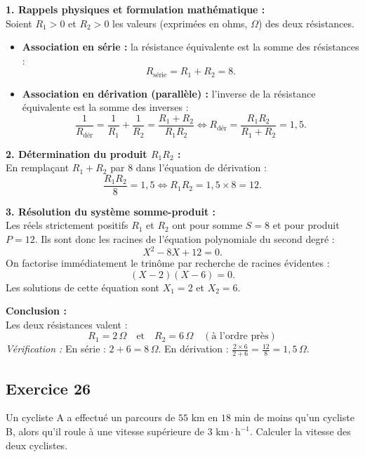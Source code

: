 \documentclass[11pt,a4paper]{article}
\begin{document}
\begin{correctionbox}
\textbf{1. Rappels physiques et formulation mathématique :}\\
Soient $R_1 > 0$ et $R_2 > 0$ les valeurs (exprimées en ohms, $\Omega$) des deux résistances.
\begin{itemize}[leftmargin=*,label=\textbullet]
    \item \textbf{Association en série :} la résistance équivalente est la somme des résistances :
    \[
    R_{\text{série}} = R_1 + R_2 = 8.
    \]
    \item \textbf{Association en dérivation (parallèle) :} l'inverse de la résistance équivalente est la somme des inverses :
    \[
    \frac{1}{R_{\text{dér}}} = \frac{1}{R_1} + \frac{1}{R_2} = \frac{R_1 + R_2}{R_1 R_2} \iff R_{\text{dér}} = \frac{R_1 R_2}{R_1 + R_2} = 1{,}5.
    \]
\end{itemize}

\textbf{2. Détermination du produit $R_1 R_2$ :}\\
En remplaçant $R_1 + R_2$ par $8$ dans l'équation de dérivation :
\[
\frac{R_1 R_2}{8} = 1{,}5 \iff R_1 R_2 = 1{,}5 \times 8 = 12.
\]

\textbf{3. Résolution du système somme-produit :}\\
Les réels strictement positifs $R_1$ et $R_2$ ont pour somme $S = 8$ et pour produit $P = 12$. Ils sont donc les racines de l'équation polynomiale du second degré :
\[
X^2 - 8X + 12 = 0.
\]
On factorise immédiatement le trinôme par recherche de racines évidentes :
\[
(X - 2)(X - 6) = 0.
\]
Les solutions de cette équation sont $X_1 = 2$ et $X_2 = 6$.

\textbf{Conclusion :}\\
Les deux résistances valent :
\[
\boxed{R_1 = 2\,\Omega \quad \text{et} \quad R_2 = 6\,\Omega \quad (\text{à l'ordre près})}
\]
\textit{Vérification :} En série : $2 + 6 = 8\,\Omega$. En dérivation : $\frac{2 \times 6}{2 + 6} = \frac{12}{8} = 1{,}5\,\Omega$.
\end{correctionbox}

\subsection*{Exercice 26}
Un cycliste A a effectué un parcours de $55\text{ km}$ en $18\text{ min}$ de moins qu'un cycliste B, alors qu'il roule à une vitesse supérieure de $3\text{ km}\cdot\text{h}^{-1}$. Calculer la vitesse des deux cyclistes.
\end{document}
